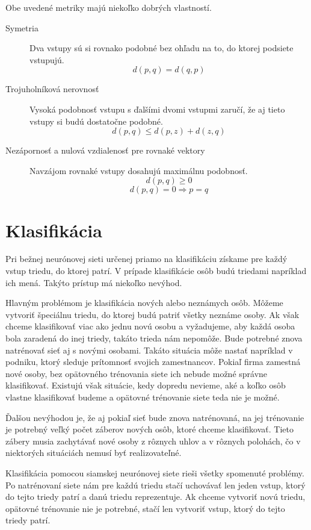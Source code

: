 Obe uvedené metriky majú niekoľko dobrých vlastností.
\begin{description}
\item[Symetria] Dva vstupy sú si rovnako podobné bez ohľadu na to, do ktorej podsiete vstupujú. 
$$d(p, q) = d(q, p) $$
\item[Trojuholníková nerovnosť] Vysoká podobnosť vstupu s ďalšími dvomi vstupmi zaručí, že aj tieto vstupy si budú dostatočne podobné.
$$d(p, q) 	\leq d(p, z) + d(z, q)$$
\item[Nezápornosť a nulová vzdialenosť pre rovnaké vektory] Navzájom rovnaké vstupy dosahujú maximálnu podobnosť.
$$d(p, q) \geq 0$$
$$d(p, q) = 0 \Rightarrow p = q$$
\end{description}

\section{Klasifikácia} \label{siam_class}
Pri bežnej neurónovej sieti určenej priamo na klasifikáciu získame pre každý vstup triedu, do ktorej patrí.
V prípade klasifikácie osôb budú triedami napríklad ich mená.
Takýto prístup má niekoľko nevýhod.

Hlavným problémom je klasifikácia nových alebo neznámych osôb. 
Môžeme vytvoriť špeciálnu triedu, do ktorej budú patriť všetky neznáme osoby.
Ak však chceme klasifikovať viac ako jednu novú osobu a vyžadujeme, aby každá osoba bola zaradená do inej triedy, takáto trieda nám nepomôže.
Bude potrebné znova natrénovať sieť aj s novými osobami.
Takáto situácia môže nastať napríklad v podniku, ktorý sleduje prítomnosť svojich zamestnancov.
Pokiaľ firma zamestná nové osoby, bez opätovného trénovania siete ich nebude možné správne klasifikovať.
Existujú však situácie, kedy dopredu nevieme, aké a koľko osôb vlastne klasifikovať budeme a opätovné trénovanie siete teda nie je možné.

Ďalšou nevýhodou je, že aj pokiaľ sieť bude znova natrénovaná, na jej trénovanie je potrebný veľký počet záberov nových osôb, ktoré chceme klasifikovať.
Tieto zábery musia zachytávať nové osoby z rôznych uhlov a v rôznych polohách, čo v niektorých situáciách nemusí byť realizovateľné.

Klasifikácia pomocou siamskej neurónovej siete rieši všetky spomenuté problémy.
Po natrénovaní siete nám pre každú triedu stačí uchovávať len jeden vstup, ktorý do tejto triedy patrí a danú triedu reprezentuje.
Ak chceme vytvoriť novú triedu, opätovné trénovanie nie je potrebné, stačí len vytvoriť vstup, ktorý do tejto triedy patrí.

